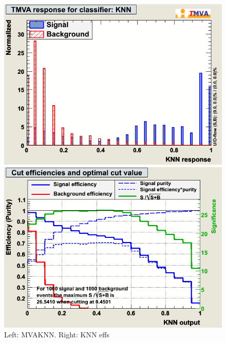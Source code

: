  
\begin{figure}[h]
 \begin{minipage}{8.5cm}
\includegraphics[width=1.0\textwidth]{images/pkMva_KNN.png}
\end{minipage}
 \hfill
\begin{minipage}{8.5cm}
\includegraphics[width=1.0\textwidth]{images/pkMvaEffs_KNN.png}
\end{minipage}
\caption{Left: MVAKNN. Right: KNN effs}
\label{fig:pkMvaKNN}
\end{figure}


